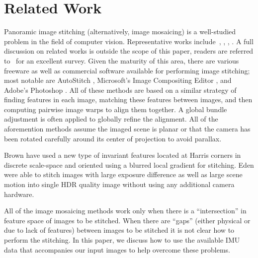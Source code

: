 \documentclass[10pt,twocolumn,letterpaper]{article}
\begin{document}
\section{Related Work}

Panoramic image stitching (alternatively, image mosaicing) is a
well-studied problem in the field of computer vision.  Representative
works include~\cite{Milgram1975}, \cite{Milgram1977}, \cite{Capel},
\cite{Szeliski1997} \cite{Brown07} \cite{Brown03}.  A full discussion
on related works is outside the scope of this paper, readers are
referred to~\cite{Szeliski05imagealignment} for an excellent survey.
Given the maturity of this area, there are various freeware as well as
commercial software available for performing image stitching; most
notable are AutoStitch \cite{autostitch}, Microsoft’s Image
Compositing Editor \cite{ICE}, and Adobe’s Photoshop \cite{photoshop}.
All of these methods are based on a similar strategy of finding
features in each image, matching these features between images, and
then computing pairwise image warps to align them together.  A global
bundle adjustment is often applied to globally refine the alignment.
All of the aforemention methods assume the imaged scene is planar or
that the camera has been rotated carefully around its center of
projection to avoid parallax.


Brown \etal \cite{Brown05} have used a new type of invariant features
located at Harris corners in discrete scale-space and oriented using a
blurred local gradient for stitching. Eden \etal \cite{Eden} were
able to stitch images with large exposure difference as well as large
scene motion into single HDR quality image without using any
additional camera hardware.

All of the image mosaicing methods work only when there is a
``intersection'' in feature space of images to be stitched. When there
are ``gaps'' (either physical or due to lack of features) between
images to be stitched it is not clear how to perform the stitching. In
this paper, we discuss how to use the available IMU data that
accompanies our input images to help overcome these problems.
\end{document}
